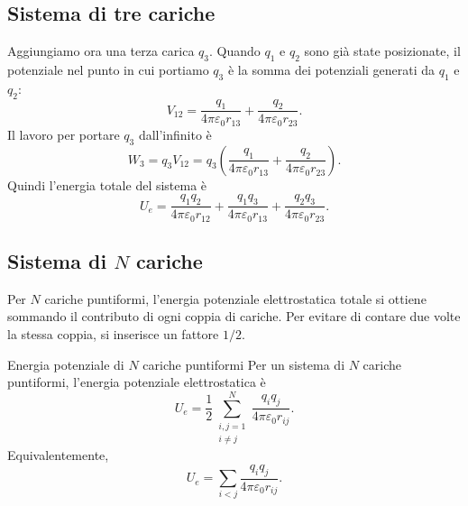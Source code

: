 \documentclass[a4paper]{article}
\begin{document}
\subsection{Sistema di tre cariche}

Aggiungiamo ora una terza carica \(q_3\). Quando \(q_1\) e \(q_2\) sono già state posizionate, il potenziale nel punto in cui portiamo \(q_3\) è la somma dei potenziali generati da \(q_1\) e \(q_2\):
\[
    V_{12}=\frac{q_1}{4\pi\varepsilon_0r_{13}}+\frac{q_2}{4\pi\varepsilon_0r_{23}}.
\]
Il lavoro per portare \(q_3\) dall'infinito è
\[
    W_3=q_3V_{12}
    =q_3\left(\frac{q_1}{4\pi\varepsilon_0r_{13}}+\frac{q_2}{4\pi\varepsilon_0r_{23}}\right).
\]
Quindi l'energia totale del sistema è
\[
    U_e=\frac{q_1q_2}{4\pi\varepsilon_0r_{12}}
    +\frac{q_1q_3}{4\pi\varepsilon_0r_{13}}
    +\frac{q_2q_3}{4\pi\varepsilon_0r_{23}}.
\]

\begin{center}
\end{center}

\subsection{Sistema di \(N\) cariche}

Per \(N\) cariche puntiformi, l'energia potenziale elettrostatica totale si ottiene sommando il contributo di ogni coppia di cariche. Per evitare di contare due volte la stessa coppia, si inserisce un fattore \(1/2\).

\begin{snippettheorem}{Energia potenziale di \(N\) cariche puntiformi}
    Per un sistema di \(N\) cariche puntiformi, l'energia potenziale elettrostatica è
    \[
        U_e=\frac{1}{2}\sum_{\substack{i,j=1\\ i\neq j}}^N
        \frac{q_iq_j}{4\pi\varepsilon_0r_{ij}}.
    \]
    Equivalentemente,
    \[
        U_e=\sum_{i<j}\frac{q_iq_j}{4\pi\varepsilon_0r_{ij}}.
    \]
\end{snippettheorem}
\end{document}
